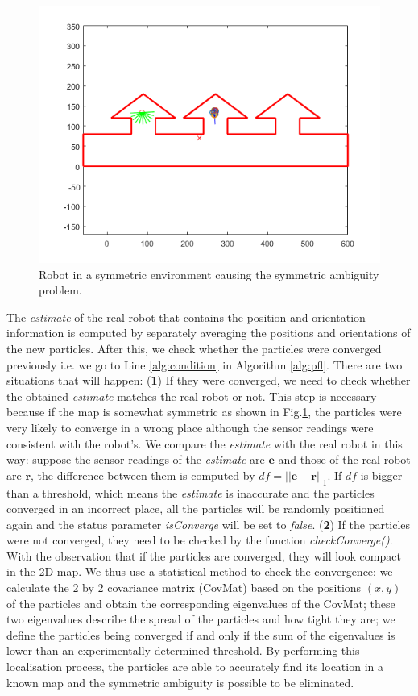 \documentclass[12pt]{article}
\begin{document}
\begin{figure}[h]
\centering
  \includegraphics[scale=0.6]{symm}
  \caption{Robot in a symmetric environment causing the symmetric ambiguity problem.}
  \label{fig:symm}
\end{figure}

The {\itshape estimate} of the real robot that contains the position and orientation information is computed by separately averaging the positions and orientations of the new particles. After this, we check whether the particles were converged previously i.e. we go to Line \ref{alg:condition} in Algorithm \ref{alg:pfl}. There are two situations that will happen: (\textbf{1}) If they were converged, we need to check whether the obtained {\itshape estimate} matches the real robot or not. This step is necessary because if the map is somewhat symmetric as shown in Fig.\ref{fig:symm}, the particles were very likely to converge in a wrong place although the sensor readings were consistent with the robot's. We compare the {\itshape estimate} with the real robot in this way: suppose the sensor readings of the {\itshape estimate} are $\mathbf{e}$ and those of the real robot are $\mathbf{r}$, the difference between them is computed by $df=||\mathbf{e}-\mathbf{r}||_{1}$. If $df$ is bigger than a threshold, which means the {\itshape estimate} is inaccurate and the particles converged in an incorrect place, all the particles will be randomly positioned again and the status parameter {\itshape isConverge} will be set to {\itshape false}. (\textbf{2}) If the particles were not converged, they need to be checked by the function {\itshape checkConverge()}. With the observation that if the particles are converged, they will look compact in the 2D map. We thus use a statistical method to check the convergence: we calculate the 2 by 2 covariance matrix (CovMat) based on the positions $(x,y)$ of the particles and obtain the corresponding eigenvalues of the CovMat; these two eigenvalues describe the spread of the particles and how tight they are; we define the particles being converged if and only if the sum of the eigenvalues is lower than an experimentally determined threshold. By performing this localisation process, the particles are able to accurately find its location in a known map and the symmetric ambiguity is possible to be eliminated.
\end{document}
